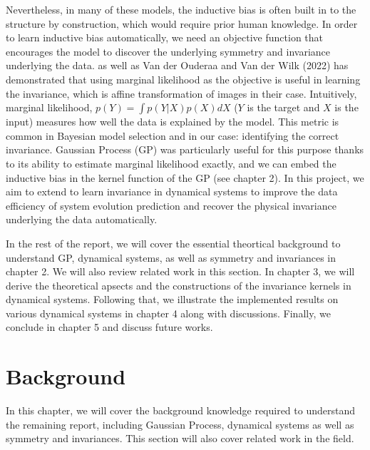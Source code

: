 \documentclass{statsmsc}
\begin{document}
Nevertheless, in many of these models, the inductive bias is often built in to the structure by construction, which would require prior human knowledge.
In order to learn inductive bias automatically, we need an objective function that encourages the model to discover the underlying symmetry and invariance underlying the data. 
\cite{Mark2017} as well as Van der Ouderaa and Van der Wilk (2022) has demonstrated that using marginal likelihood as the objective is useful in learning the invariance, which is affine transformation of images in their case.
Intuitively, marginal likelihood, $p(Y)=\int p(Y|X)p(X)dX$ ($Y$ is the target and $X$ is the input) measures how well the data is explained by the model.
This metric is common in Bayesian model selection and in our case: identifying the correct invariance. 
Gaussian Process (GP) was particularly useful for this purpose thanks to its ability to estimate marginal likelihood exactly, and we can embed the inductive bias in the kernel function of the GP (see chapter 2).
In this project, we aim to extend \cite{Mark2017} to learn invariance in dynamical systems to improve the data efficiency of system evolution prediction and recover the physical invariance underlying the data automatically. 

In the rest of the report, we will cover the essential theortical background to understand GP, dynamical systems, as well as symmetry and invariances in chapter 2. We will also review related work in this section.
In chapter 3, we will derive the theoretical apsects and the constructions of the invariance kernels in dynamical systems.
Following that, we illustrate the implemented results on various dynamical systems in chapter 4 along with discussions.
Finally, we conclude in chapter 5 and discuss future works.

 
\chapter{Background}
In this chapter, we will cover the background knowledge required to understand the remaining report, including Gaussian Process, dynamical systems as well as symmetry and invariances. 
This section will also cover related work in the field.
\end{document}
